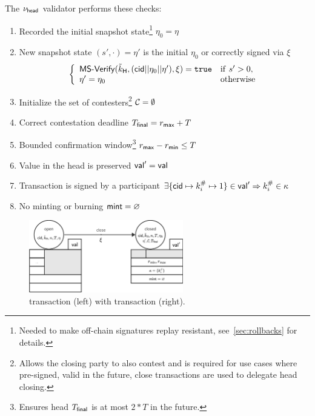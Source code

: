 \begin{samepage}
\noindent The $\nu_\mathsf{head}$ validator performs these checks:
\begin{enumerate}
  \item Recorded the initial snapshot state\footnote{Needed to make off-chain signatures replay resistant, see~\ref{sec:rollbacks} for details.} $\eta_0 = \eta$
  \item New snapshot state $(s', \cdot) = \eta'$ is the initial $\eta_{0}$
        or correctly signed via $\xi$ \\
        \[
          \left\{\begin{array}{ll}
                  \mathsf{MS\textsf{-}{}Verify}(\tilde{k}_{\mathsf{H}},(\mathsf{cid} || \eta_{0} || \eta'),\xi) = \mathtt{true} & \mathrm{if} ~ s' > 0, \\
                  \eta' = \eta_{0} & \mathrm{otherwise}
                 \end{array}\right.
        \]
  \item Initialize the set of contesters\footnote{Allows the closing party
        to also contest and is required for use cases where pre-signed, valid in
        the future, close transactions are used to delegate head closing.}
        $\mathcal{C} = \emptyset$
  \item Correct contestation deadline $T_{\mathsf{final}} = r_{\mathsf{max}} + T$
  \item Bounded confirmation window\footnote{Ensures head $T_{\mathsf{final}}$ is at most
        $2*T$ in the future.} $r_{\mathsf{max}} - r_{\mathsf{min}} \leq T$
  \item Value in the head is preserved $\mathsf{val}' = \mathsf{val}$
  \item Transaction is signed by a participant $\exists \{\mathsf{cid} \mapsto k^{\#}_{i} \mapsto 1\} \in \mathsf{val}' \Rightarrow k^{\#}_{i} \in \kappa$
  \item No minting or burning $\mathsf{mint} = \varnothing$
\end{enumerate}
\end{samepage}

\begin{figure}[h]
  \centering
  \includegraphics[width=0.6\textwidth]{figures/SM-close.pdf}
  \caption{\mtxCCom{} transaction (left) with \mtxClose{} transaction
    (right).}\label{fig:SM-close}
\end{figure}

